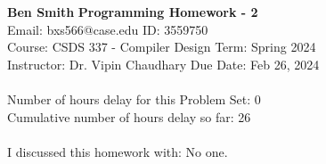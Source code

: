 \documentclass[a4paper, 11pt]{article}
\begin{document}
\noindent
\large\textbf{Ben Smith} \hfill \textbf{Programming Homework - 2}   \\
Email: bxs566@case.edu \hfill ID: 3559750 \\
\normalsize Course: CSDS 337 - Compiler Design \hfill Term: Spring 2024\\
Instructor: Dr. Vipin Chaudhary \hfill Due Date: Feb 26, 2024 \\ \\
Number of hours delay for this Problem Set: \hfill 0\\
Cumulative number of hours delay so far: \hfill 26 \\ \\
I discussed this homework with: \hfill No one. \\
\end{document}
